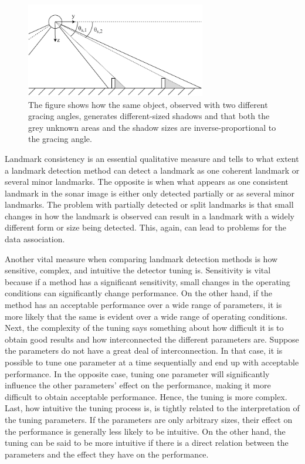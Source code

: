 \begin{figure}
    \centering
    \includegraphics[width=0.7\textwidth]{figures/object_shadow.drawio.pdf}
    \caption{The figure shows how the same object, observed with two different gracing angles, generates different-sized shadows and that both the grey unknown areas and the shadow sizes are inverse-proportional to the gracing angle.}
    \label{fig:object_shadow}
\end{figure}

Landmark consistency is an essential qualitative measure and tells to what extent a landmark detection method can detect a landmark as one coherent landmark or several minor landmarks. The opposite is when what appears as one consistent landmark in the sonar image is either only detected partially or as several minor landmarks. The problem with partially detected or split landmarks is that small changes in how the landmark is observed can result in a landmark with a widely different form or size being detected. This, again, can lead to problems for the data association. 

Another vital measure when comparing landmark detection methods is how sensitive, complex, and intuitive the detector tuning is. Sensitivity is vital because if a method has a significant sensitivity, small changes in the operating conditions can significantly change performance. On the other hand, if the method has an acceptable performance over a wide range of parameters, it is more likely that the same is evident over a wide range of operating conditions. Next, the complexity of the tuning says something about how difficult it is to obtain good results and how interconnected the different parameters are. Suppose the parameters do not have a great deal of interconnection. In that case, it is possible to tune one parameter at a time sequentially and end up with acceptable performance. In the opposite case, tuning one parameter will significantly influence the other parameters' effect on the performance, making it more difficult to obtain acceptable performance. Hence, the tuning is more complex. Last, how intuitive the tuning process is, is tightly related to the interpretation of the tuning parameters. If the parameters are only arbitrary sizes, their effect on the performance is generally less likely to be intuitive. On the other hand, the tuning can be said to be more intuitive if there is a direct relation between the parameters and the effect they have on the performance.     
